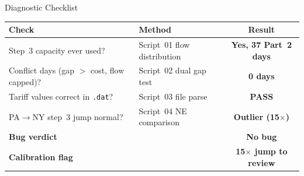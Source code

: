 \documentclass[aspectratio=169, 11pt]{beamer}
\begin{document}
\begin{frame}{Diagnostic Checklist}
  \begin{table}
    \centering
    \begin{tabular}{llc}
      \toprule
      \textbf{Check} & \textbf{Method} & \textbf{Result} \\
      \midrule
      Step~3 capacity ever used? & Script~01 flow distribution & \textcolor{okgreen}{\textbf{Yes, 37 Part~2 days}} \\
      Conflict days (gap $>$ cost, flow capped)? & Script~02 dual gap test & \textcolor{okgreen}{\textbf{0 days}} \\
      Tariff values correct in \texttt{.dat}? & Script~03 file parse & \textcolor{okgreen}{\textbf{PASS}} \\
      PA$\to$NY step~3 jump normal? & Script~04 NE comparison & \textcolor{alertred}{\textbf{Outlier (15$\times$)}} \\
      \midrule
      \textbf{Bug verdict} & & \textcolor{okgreen}{\textbf{No bug}} \\
      \textbf{Calibration flag} & & \textcolor{alertred}{\textbf{15$\times$ jump to review}} \\
      \bottomrule
    \end{tabular}
  \end{table}
\end{frame}
\end{document}
